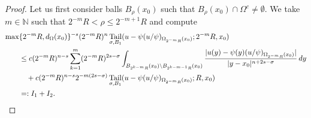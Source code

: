 \documentclass[11pt,reqno]{amsart}
\theoremstyle{plain}
\theoremstyle{definition}
\numberwithin{equation}{section}
\newcommand{\N}{\mathbb{N}}
\newcommand{\1}{\mathbbm{1}}
\DeclareMathOperator{\tail}{Tail}
\renewcommand{\d}{\textnormal{\,d}}
\begin{document}
\begin{proof}
Let us first consider balls $B_{\rho}(x_0)$ such that $B_{\rho}(x_0) \cap \Omega^c \not=\emptyset$. We take $m \in \N$ such that $2^{-m} R < \rho \le 2^{-m+1}R$ and compute
\begin{align*}
\max&\{2^{-m}R,d_{\Omega}(x_0)\}^{-s} (2^{-m}R)^{n} \tail_{\sigma,B_1}(u- \psi (u/\psi)_{\Omega_{2^{-m}R}(x_0)}; 2^{-m}R , x_0) \\
&\le c (2^{-m}R)^{n-s} \sum_{k = 1}^m (2^{-m}R)^{2s - \sigma} \int_{B_{2^{k-m}R}(x_0) \setminus B_{2^{k-m-1}R}(x_0)} \frac{|u(y)- \psi(y) (u/\psi)_{\Omega_{2^{-m}R}(x_0)}|}{|y - x_0|^{n+2s-\sigma}} \d y \\
&\quad + c (2^{-m}R)^{n-s} 2^{-m(2s - \sigma)} \tail_{\sigma,B_1}(u - \psi (u/\psi)_{\Omega_{2^{-m}R}(x_0)};R,x_0) \\
&=: I_1 + I_2.
\end{align*}


\end{proof}
\end{document}
